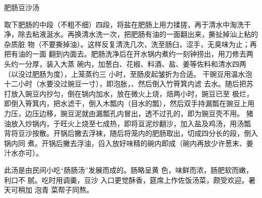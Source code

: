 \begin{recipe}{肥肠豆沙汤}

\ingredients


\cooking

\step 取下肥肠的中段（不粗不细）四段，将盐在肥肠上用力揉搓，再于清水中淘洗干
净，除去粘液涎水。再换清水洗一次，把肥肠有油的一面翻出来，撕扯掉汕上粘的杂质脏
物（不要撕掉油）。这样反复清洗几次，洗至肠臼，涩手，无臭味为止；再把有油的一面
翻到内面去。肥肠洗净后在开水锅内煮约一刻钟捞出，用刀修去两头约一分厚，装入大蒸
碗内，加葱白、花椒、料酒、盐、姜等佐料和清水四两（以没过肥肠为度），上笼蒸约三
小时，至肠皮起皱折为合适。
\step 干豌豆用温水泡十二小时（水要没过豌豆一寸），即泡胀，、然后倒入竹筲箕内滤
去水。随后把苏打放入豌豆内抄匀，倒在锅内加水，放在微火上烧，焙两小时，豌豆已至
极烂，即倒入筲箕内，把水滤干，倒入木瓢内（目水的瓢），然后双手持漏瓢在豌豆上用
力压，边压边移，豌豆泥就由漏瓢孔内冒出，透不过孔的，即为豌豆壳不用。
\step 猪油放入炒锅内，于旺火上烧至七成热，即将亘泥炒翻沙，加入盐及鸡汤，用汤瓢
背将豆沙按散。开锅后撇去浮袜，随后将笼内的肥肠取出，切成四分长的段，倒入锅内同
煮。开锅后撇去浮油，舀入放好味精的碗内即成（碗内再放少许葱末、姜汁水亦可）。

\notes

此汤是由民间小吃“肠肠汤”发展而成的。肠略呈黄 色，味鲜而浓，肠肥软而嫩，利口不
腻。吃时用调羹，豆沙 入口更觉酥香，筵席上作佐饭汤菜，颇受欢迎。暑天可稍加 泡青
菜帮子同熬。

\end{recipe}

